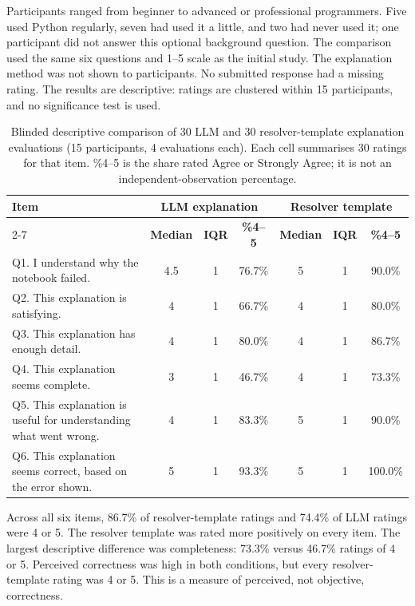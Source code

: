 Participants ranged from beginner to advanced or professional programmers.
Five used Python regularly, seven had used it a little, and two had never used
it; one participant did not answer this optional background question. The
comparison used the same six questions and 1--5 scale as the initial study.
The explanation method was not shown to participants. No submitted response
had a missing rating. The results are descriptive: ratings are clustered within
15 participants, and no significance test is used.

\begin{table}[htbp]
  \centering
  \small
  \setlength{\tabcolsep}{3pt}
  \begin{tabular}{|p{5.35cm}|c|c|c|c|c|c|}
    \hline
    \textbf{Item} & \multicolumn{3}{c|}{\textbf{LLM explanation}} & \multicolumn{3}{c|}{\textbf{Resolver template}} \\
    \cline{2-7}
     & \textbf{Median} & \textbf{IQR} & \textbf{\%4--5} & \textbf{Median} & \textbf{IQR} & \textbf{\%4--5} \\
    \hline
    Q1. I understand why the notebook failed. & 4.5 & 1 & 76.7\% & 5 & 1 & 90.0\% \\
    \hline
    Q2. This explanation is satisfying. & 4 & 1 & 66.7\% & 4 & 1 & 80.0\% \\
    \hline
    Q3. This explanation has enough detail. & 4 & 1 & 80.0\% & 4 & 1 & 86.7\% \\
    \hline
    Q4. This explanation seems complete. & 3 & 1 & 46.7\% & 4 & 1 & 73.3\% \\
    \hline
    Q5. This explanation is useful for understanding what went wrong. & 4 & 1 & 83.3\% & 5 & 1 & 90.0\% \\
    \hline
    Q6. This explanation seems correct, based on the error shown. & 5 & 1 & 93.3\% & 5 & 1 & 100.0\% \\
    \hline
  \end{tabular}
  \caption{Blinded descriptive comparison of 30 LLM and 30 resolver-template
  explanation evaluations (15 participants, 4 evaluations each). Each cell
  summarises 30 ratings for that item. \%4--5 is the share rated Agree or
  Strongly Agree; it is not an independent-observation percentage.}
  \label{tab:v-human-eval-comparison}
\end{table}

Across all six items, 86.7\% of resolver-template ratings and 74.4\% of LLM
ratings were 4 or 5. The resolver template was rated more positively on every
item. The largest descriptive difference was completeness: 73.3\% versus
46.7\% ratings of 4 or 5. Perceived correctness was high in both conditions,
but every resolver-template rating was 4 or 5. This is a measure of perceived,
not objective, correctness.

